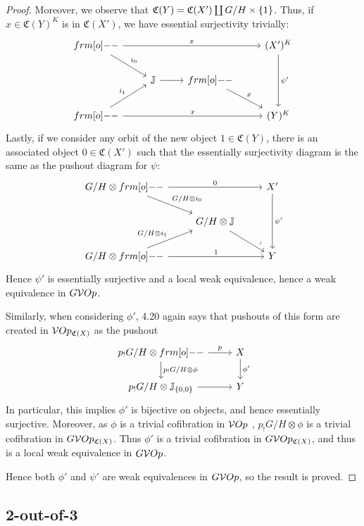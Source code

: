 \documentclass[psamsfonts,onesided,10pt,letterpaper]{amsart}%
\renewcommand{\C}{\ensuremath{\mathfrak{C}}}
\newcommand{\J}{\ensuremath{\mathbb{J}}}
\begin{document}
\begin{proof}
Moreover, we observe that $\C(Y) = \C(X')\coprod G/H\times \set{1}$. Thus, if $x\in \C(Y)^K$ is in $\C(X')$, we have essential surjectivity trivially:
\[
\begin{tikzcd}
   \1 \arrow[rrr, "x"] \arrow[dr, " i_0"] &&& (X')^K \arrow[dd, "\psi'"] \\
  &  \J \arrow[r] &  \1 \arrow[dr, "x"] \\
   \1 \arrow[ur, " i_1"] \arrow[rrr,"x"] &&& (Y)^K
\end{tikzcd}
\]
Lastly, if we consider any orbit of the new object $1\in \C(Y)$, there is an associated object $0\in\C(X')$ such that the essentially surjectivity diagram is the same as the pushout diagram for $\psi$:
\[
\begin{tikzcd}
  G/H\otimes \1 \arrow[rr,"0"] \arrow[dr, "G/H\otimes i_0"] & & X' \arrow[dd, "\psi'"]\\
  & G/H\otimes \J \arrow[dr, "\mbox{\large $\lrcorner$}" near end] \\
  G/H\otimes \1 \arrow[ur, "G/H\otimes i_1"] \arrow[rr, "1"] && Y
\end{tikzcd}
\]
Hence $\psi'$ is essentially surjective and a local weak equivalence, hence a weak equivalence in $G\mathcal V Op$. 

Similarly, when considering $\phi'$, \cite{Cav14} 4.20 again says that pushouts of this form are created in $\V Op_{\C(X)}$ as the pushout
\[
\begin{tikzcd}
  p_! G/H\otimes \1 \arrow[r, "p"] \arrow[d, "p_!G/H\otimes \phi"] & X \arrow[d,"\phi'"] \\
  p_! G/H\otimes \J_{\set{0,0}} \arrow[r] & Y
\end{tikzcd}
\]
In particular, this implies $\phi'$ is bijective on objects, and hence essentially surjective. Moreover, as $\phi$ is a trivial cofibration in $\mathcal V Op$ \cite{Cav14}, $p_!G/H\otimes \phi$ is a trivial cofibration in $G \V Op_{\C(X)}$. Thus $\phi'$ is a trivial cofibration in $G\V Op_{\C(X)}$, and thus is a local weak equivalence in $G \mathcal V Op$.

Hence both $\phi'$ and $\psi'$ are weak equivalences in $G\mathcal V Op$, so the result is proved.
\end{proof}

\subsection{2-out-of-3}
\end{document}
